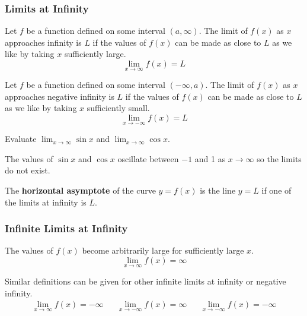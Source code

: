 \subsubsection{Limits at Infinity}
\begin{definition}
    Let \(f\) be a function defined on some interval \((a,\infty)\).
    The limit of \(f(x)\) as \(x\) approaches infinity is \(L\) if the values
    of \(f(x)\) can be made as close to \(L\) as we like by taking \(x\)
    sufficiently large.
    \[\lim_{x\to\infty}f(x)=L\]
\end{definition}
\begin{definition}
    Let \(f\) be a function defined on some interval \((-\infty,a)\).
    The limit of \(f(x)\) as \(x\) approaches negative infinity is \(L\) if
    the values of \(f(x)\) can be made as close to \(L\) as we like by taking \(x\)
    sufficiently small.
    \[\lim_{x\to -\infty}f(x)=L\]
\end{definition}
\begin{problem}
    Evaluate \(\lim_{x\to\infty}\sin x\) and \(\lim_{x\to\infty}\cos x\).
\end{problem}
\begin{solution}
    The values of \(\sin x\) and \(\cos x\) oscillate between \(-1\) and 1 as
    \(x\to\infty\) so the limits do not exist.
\end{solution}
\begin{definition}
    The \textbf{horizontal asymptote} of the curve \(y=f(x)\) is the line \(y=L\)
    if one of the limits at infinity is \(L\).
\end{definition}

\subsubsection{Infinite Limits at Infinity}
\begin{definition}
    The values of \(f(x)\) become arbitrarily large for sufficiently large \(x\).
    \[\lim_{x\to\infty}f(x)=\infty\]
\end{definition}
Similar definitions can be given for other infinite limits at infinity or
negative infinity.
\begin{align*}
    &\lim_{x\to\infty}f(x)=-\infty&&\lim_{x\to -\infty}f(x)=\infty&
    &\lim_{x\to -\infty}f(x)=-\infty&
\end{align*}

